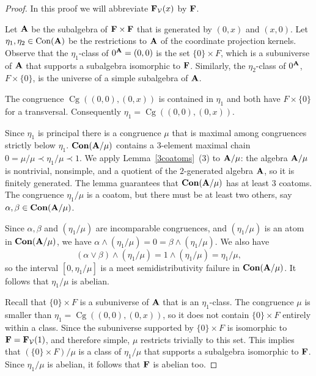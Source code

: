 \begin{proof}
  In this proof we will abbreviate ${{\mathbf{\uppercase{f}}}}_{\mathcal V}(x)$ by ${{\mathbf{\uppercase{f}}}}$.
  
  Let ${{\mathbf{\uppercase{a}}}}$ be the subalgebra of
  ${{\mathbf{\uppercase{f}}}}\times {{\mathbf{\uppercase{f}}}}$ that is generated
  by $(0,x)$ and $(x,0)$. Let $\eta_1, \eta_2\in\operatorname{Con}({{\mathbf{\uppercase{a}}}})$
  be the restrictions to ${{\mathbf{\uppercase{a}}}}$ of the 
  coordinate projection kernels. Observe that the $\eta_1$-class
  of $0^{{{\mathbf{\uppercase{a}}}}} = (0,0)$ is the set $\{0\}\times F$, which is a
  subuniverse of ${{\mathbf{\uppercase{a}}}}$ that supports a subalgebra isomorphic to ${{\mathbf{\uppercase{f}}}}$.
  Similarly, the $\eta_2$-class of $0^{{{\mathbf{\uppercase{a}}}}}$,
  $F\times \{0\}$, is the universe of a simple subalgebra of ${{\mathbf{\uppercase{a}}}}$.

  The congruence $\operatorname{Cg}((0,0),(0,x))$ is contained in
  $\eta_1$ and both have $F\times \{0\}$ for a transversal.
  Consequently $\eta_1 = \operatorname{Cg}((0,0),(0,x))$.

  Since $\eta_1$ is principal there
  is a congruence $\mu$ that is maximal among congruences
  strictly below $\eta_1$. $\operatorname{\mathbf{Con}}({{\mathbf{\uppercase{a}}}}/\mu)$ contains
  a $3$-element maximal chain $0 = \mu/\mu\prec \eta_1/\mu\prec 1$.
  We apply Lemma~\ref{3coatoms}~(3) to ${{\mathbf{\uppercase{a}}}}/\mu$: the algebra ${{\mathbf{\uppercase{a}}}}/\mu$
  is nontrivial, nonsimple, and a quotient of the $2$-generated
  algebra ${{\mathbf{\uppercase{a}}}}$, so it is finitely generated. The lemma guarantees
  that $\operatorname{\mathbf{Con}}({{\mathbf{\uppercase{a}}}}/\mu)$ has at least $3$ coatoms. The congruence
  $\eta_1/\mu$ is a coatom, but there must be at least two
  others, say $\alpha, \beta\in\operatorname{\mathbf{Con}}({{\mathbf{\uppercase{a}}}}/\mu)$.

  Since $\alpha, \beta$ and $(\eta_1/\mu)$ are incomparable congruences,
  and $(\eta_1/\mu)$ is an atom in $\operatorname{\mathbf{Con}}({{\mathbf{\uppercase{a}}}}/\mu)$,
  we have $\alpha\wedge (\eta_1/\mu) = 0 = \beta\wedge (\eta_1/\mu)$.
  We also have
  \[
(\alpha\vee\beta)\wedge (\eta_1/\mu) = 
1 \wedge (\eta_1/\mu) = \eta_1/\mu,
\]
so the interval $[0,\eta_1/\mu]$ is a meet semidistributivity failure
in $\operatorname{\mathbf{Con}}({{\mathbf{\uppercase{a}}}}/\mu)$. It follows that $\eta_1/\mu$ is abelian.

Recall that $\{0\}\times F$ is a subuniverse of ${{\mathbf{\uppercase{a}}}}$
that is an $\eta_1$-class.
The congruence $\mu$ is smaller than $\eta_1 = \operatorname{Cg}((0,0),(0,x))$,
so it does not contain $\{0\}\times F$ entirely within a class.
Since the subuniverse supported by $\{0\}\times F$
is isomorphic to ${{\mathbf{\uppercase{f}}}}={{\mathbf{\uppercase{f}}}}_{\mathcal V}(1)$, and therefore simple,
$\mu$ restricts
trivially to this set. This implies that
$(\{0\}\times F)/\mu$
is a class of $\eta_1/\mu$ 
that supports a subalgebra
isomorphic to ${{\mathbf{\uppercase{f}}}}$. Since $\eta_1/\mu$ is abelian, it follows
that ${{\mathbf{\uppercase{f}}}}$ is abelian too.
  \end{proof}

